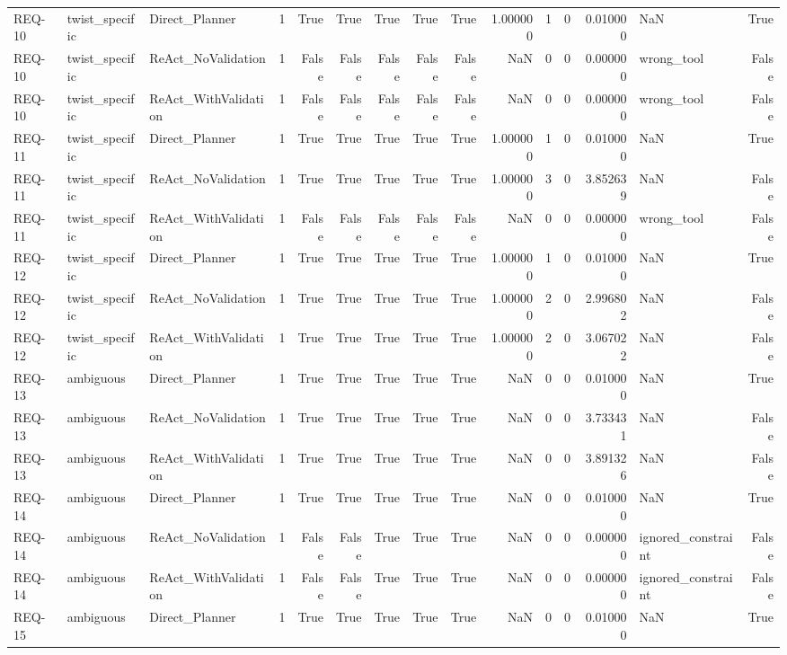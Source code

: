 \begin{table}[htbp]
\begin{tabular}{lllrrrrrrrrrrlr}
REQ-10 & twist\_specific & Direct\_Planner & 1 & True & True & True & True & True & 1.000000 & 1 & 0 & 0.010000 & NaN & True \\
REQ-10 & twist\_specific & ReAct\_NoValidation & 1 & False & False & False & False & False & NaN & 0 & 0 & 0.000000 & wrong\_tool & False \\
REQ-10 & twist\_specific & ReAct\_WithValidation & 1 & False & False & False & False & False & NaN & 0 & 0 & 0.000000 & wrong\_tool & False \\
REQ-11 & twist\_specific & Direct\_Planner & 1 & True & True & True & True & True & 1.000000 & 1 & 0 & 0.010000 & NaN & True \\
REQ-11 & twist\_specific & ReAct\_NoValidation & 1 & True & True & True & True & True & 1.000000 & 3 & 0 & 3.852639 & NaN & False \\
REQ-11 & twist\_specific & ReAct\_WithValidation & 1 & False & False & False & False & False & NaN & 0 & 0 & 0.000000 & wrong\_tool & False \\
REQ-12 & twist\_specific & Direct\_Planner & 1 & True & True & True & True & True & 1.000000 & 1 & 0 & 0.010000 & NaN & True \\
REQ-12 & twist\_specific & ReAct\_NoValidation & 1 & True & True & True & True & True & 1.000000 & 2 & 0 & 2.996802 & NaN & False \\
REQ-12 & twist\_specific & ReAct\_WithValidation & 1 & True & True & True & True & True & 1.000000 & 2 & 0 & 3.067022 & NaN & False \\
REQ-13 & ambiguous & Direct\_Planner & 1 & True & True & True & True & True & NaN & 0 & 0 & 0.010000 & NaN & True \\
REQ-13 & ambiguous & ReAct\_NoValidation & 1 & True & True & True & True & True & NaN & 0 & 0 & 3.733431 & NaN & False \\
REQ-13 & ambiguous & ReAct\_WithValidation & 1 & True & True & True & True & True & NaN & 0 & 0 & 3.891326 & NaN & False \\
REQ-14 & ambiguous & Direct\_Planner & 1 & True & True & True & True & True & NaN & 0 & 0 & 0.010000 & NaN & True \\
REQ-14 & ambiguous & ReAct\_NoValidation & 1 & False & False & True & True & True & NaN & 0 & 0 & 0.000000 & ignored\_constraint & False \\
REQ-14 & ambiguous & ReAct\_WithValidation & 1 & False & False & True & True & True & NaN & 0 & 0 & 0.000000 & ignored\_constraint & False \\
REQ-15 & ambiguous & Direct\_Planner & 1 & True & True & True & True & True & NaN & 0 & 0 & 0.010000 & NaN & True \\

\end{tabular}
\end{table}
